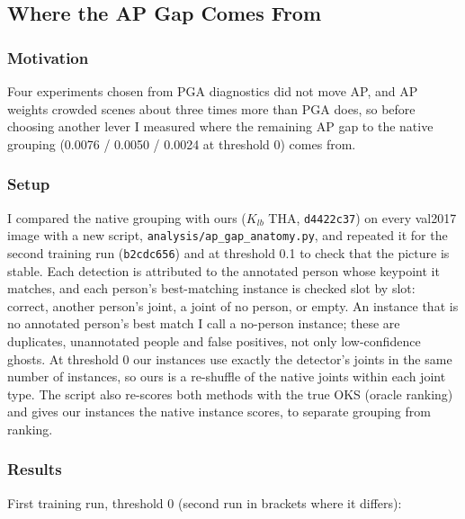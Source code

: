 \subsection{Where the AP Gap Comes From}

\subsubsection{Motivation}

Four experiments chosen from PGA diagnostics did not move AP, and AP weights crowded scenes about three times more than PGA does, so before choosing another lever I measured where the remaining AP gap to the native grouping (0.0076 / 0.0050 / 0.0024 at threshold 0) comes from.

\subsubsection{Setup}

I compared the native grouping with ours ($K_{lb}$ THA, \texttt{d4422c37}) on every val2017 image with a new script, \texttt{analysis/ap\_gap\_anatomy.py}, and repeated it for the second training run (\texttt{b2cdc656}) and at threshold 0.1 to check that the picture is stable.
Each detection is attributed to the annotated person whose keypoint it matches, and each person's best-matching instance is checked slot by slot: correct, another person's joint, a joint of no person, or empty.
An instance that is no annotated person's best match I call a no-person instance; these are duplicates, unannotated people and false positives, not only low-confidence ghosts.
At threshold 0 our instances use exactly the detector's joints in the same number of instances, so ours is a re-shuffle of the native joints within each joint type.
The script also re-scores both methods with the true OKS (oracle ranking) and gives our instances the native instance scores, to separate grouping from ranking.

\subsubsection{Results}

First training run, threshold 0 (second run in brackets where it differs):

